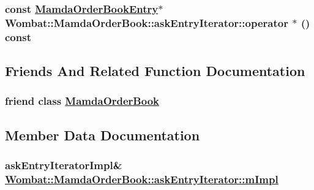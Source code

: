 \hypertarget{classWombat_1_1MamdaOrderBook_1_1askEntryIterator_2725e05e0ee8fb6243329b87eb98afd7}{
\subsubsection[operator $\ast$]{\setlength{\rightskip}{0pt plus 5cm}const \hyperlink{classWombat_1_1MamdaOrderBookEntry}{Mamda\-Order\-Book\-Entry}$\ast$ Wombat::Mamda\-Order\-Book::ask\-Entry\-Iterator::operator $\ast$ () const}}
\label{classWombat_1_1MamdaOrderBook_1_1askEntryIterator_2725e05e0ee8fb6243329b87eb98afd7}




\subsection{Friends And Related Function Documentation}
\hypertarget{classWombat_1_1MamdaOrderBook_1_1askEntryIterator_51cb271c9914c74f99c60cb638c26be7}{
\subsubsection[MamdaOrderBook]{\setlength{\rightskip}{0pt plus 5cm}friend class \hyperlink{classWombat_1_1MamdaOrderBook}{Mamda\-Order\-Book}}}
\label{classWombat_1_1MamdaOrderBook_1_1askEntryIterator_51cb271c9914c74f99c60cb638c26be7}




\subsection{Member Data Documentation}
\hypertarget{classWombat_1_1MamdaOrderBook_1_1askEntryIterator_147b01c1ef982afae2140e2485418be3}{
\subsubsection[mImpl]{\setlength{\rightskip}{0pt plus 5cm}ask\-Entry\-Iterator\-Impl\& \hyperlink{classWombat_1_1MamdaOrderBook_1_1askEntryIterator_147b01c1ef982afae2140e2485418be3}{Wombat::Mamda\-Order\-Book::ask\-Entry\-Iterator::m\-Impl}}}
\label{classWombat_1_1MamdaOrderBook_1_1askEntryIterator_147b01c1ef982afae2140e2485418be3}


